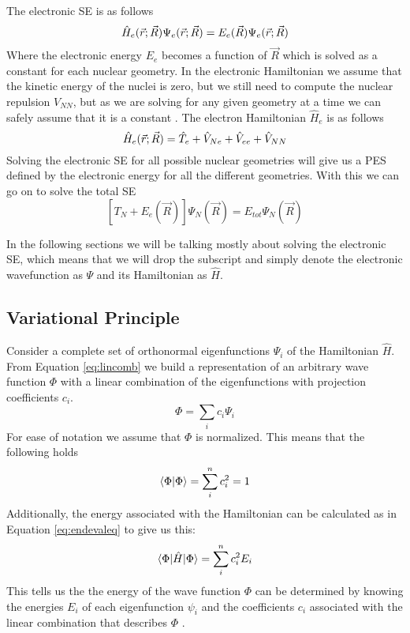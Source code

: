 \documentclass[../master_thesis.tex]{subfiles}
\begin{document}
The electronic \ac{SE} is as follows
\begin{equation}
    \hat{H}_e(\vec{r}; \vec{R}) \Psi_e(\vec{r};\vec{R}) = E_e(\vec{R})\Psi_e(\vec{r};\vec{R})
\end{equation}
Where the electronic energy $E_e$ becomes a function of $\vec{R}$ which is solved as
a constant for each nuclear geometry. In the electronic Hamiltonian
we assume that the kinetic energy of the nuclei is zero, but we still need to
compute the nuclear repulsion $V_{NN}$, but as we are solving for any given geometry at a time
we can safely assume that it is a constant \cite{Cramer:2004}. The electron
Hamiltonian $\hat{H}_e$ is as follows
\begin{equation}\label{eq:elhamiltonian}
    \hat{H}_e(\vec{r}; \vec{R}) = \hat{T}_e + \hat{V}_{Ne} + \hat{V}_{ee}  + \hat{V}_{NN}
\end{equation}
Solving the electronic \ac{SE} for all possible nuclear geometries will give us
a \ac{PES} defined by the electronic energy for all the different geometries.
With this we can go on to solve the total \ac{SE} \cite{Jensen:2017}
\begin{equation}
  \left[T_N + E_e(\vec{R})\right]\Psi_N(\vec{R}) = E_{tot}\Psi_N(\vec{R})
\end{equation}

In the following sections we will be talking mostly about solving the electronic \ac{SE},
 which means that we will drop the subscript and simply denote the electronic
wavefunction as $\Psi$ and its Hamiltonian as $\hat{H}$.

\subsection{Variational Principle}
Consider a complete set of orthonormal eigenfunctions $ \Psi_i$  of the
Hamiltonian $\hat{H}$. From Equation \ref{eq:lincomb} we build a representation of an
arbitrary wave function $\Phi$ with a linear combination of the eigenfunctions with
projection coefficients $c_i$.
\begin{equation}
  \Phi = \sum\limits_ic_i\Psi_i
\end{equation}
For ease of notation we assume that  $\Phi$ is normalized. This means that the
following holds
\begin{equation}
  \braket{\Phi|\Phi} = \sum\limits_i^nc_i^2 = 1
\end{equation}
 Additionally, the energy associated with the Hamiltonian can
be calculated as in Equation \ref{eq:endevaleq} to give us this:
\begin{equation}
  \braket{\Phi|\hat{H}|\Phi} = \sum\limits_i^nc_i^2E_i\label{eq:genenerg}
\end{equation}
This tells us the the energy of the wave function $\Phi$ can be determined by
knowing the energies $E_i$ of each eigenfunction $\psi_i$ and the coefficients
$c_i$ associated with the linear combination that describes $\Phi$
\cite{Cramer:2004}.
\end{document}
